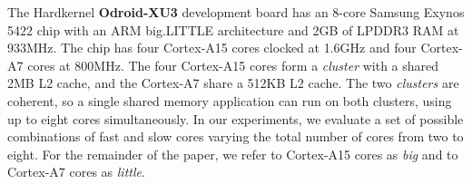 
The Hardkernel \textbf{Odroid-XU3} development board has an 8-core Samsung Exynos 5422 chip with an ARM big.LITTLE architecture and 2GB of LPDDR3 RAM at 933MHz. The chip has four Cortex-A15 cores clocked at 1.6GHz and four Cortex-A7 cores at 800MHz. The four Cortex-A15 cores form a \textit{cluster} with a shared 2MB L2 cache, and the Cortex-A7 share a 512KB L2 cache. The two \textit{clusters} are coherent, so a single shared memory application can run on both clusters, using up to eight cores simultaneously. In our experiments, we evaluate a set of possible combinations of fast and slow cores varying the total number of cores from two to eight. For the remainder of the paper, we refer to Cortex-A15 cores as \textit{big} and to Cortex-A7 cores as \textit{little}.

